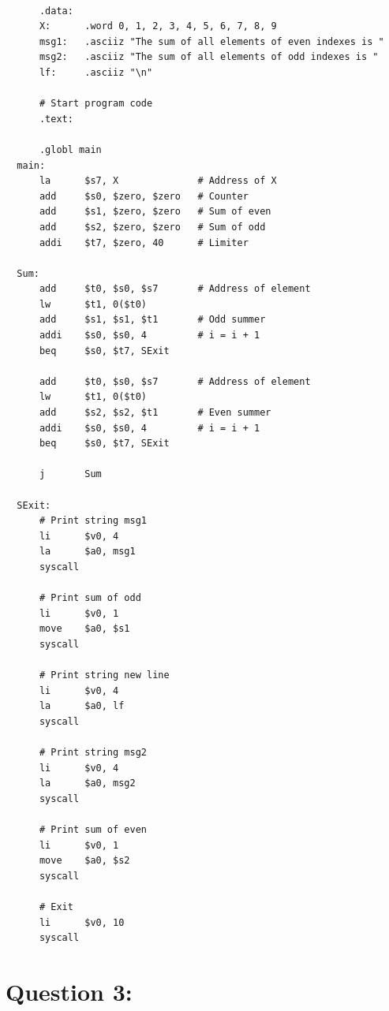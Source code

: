 \documentclass[12pt,a4paper]{article}
\begin{document}
\begin{mdframed}[hidealllines=true,backgroundcolor=magenta!10]
  \begin{lstlisting}

      .data:
      X:      .word 0, 1, 2, 3, 4, 5, 6, 7, 8, 9
      msg1:   .asciiz "The sum of all elements of even indexes is "
      msg2:   .asciiz "The sum of all elements of odd indexes is "
      lf:     .asciiz "\n"

      # Start program code
      .text:

      .globl main
  main:
      la      $s7, X              # Address of X
      add     $s0, $zero, $zero   # Counter
      add     $s1, $zero, $zero   # Sum of even
      add     $s2, $zero, $zero   # Sum of odd
      addi    $t7, $zero, 40      # Limiter

  Sum:
      add     $t0, $s0, $s7       # Address of element
      lw      $t1, 0($t0)
      add     $s1, $s1, $t1       # Odd summer
      addi    $s0, $s0, 4         # i = i + 1
      beq     $s0, $t7, SExit

      add     $t0, $s0, $s7       # Address of element
      lw      $t1, 0($t0)
      add     $s2, $s2, $t1       # Even summer
      addi    $s0, $s0, 4         # i = i + 1
      beq     $s0, $t7, SExit

      j       Sum

  SExit:
      # Print string msg1
      li      $v0, 4
      la      $a0, msg1
      syscall

      # Print sum of odd
      li      $v0, 1
      move    $a0, $s1
      syscall

      # Print string new line
      li      $v0, 4
      la      $a0, lf
      syscall

      # Print string msg2
      li      $v0, 4
      la      $a0, msg2
      syscall

      # Print sum of even
      li      $v0, 1
      move    $a0, $s2
      syscall

      # Exit
      li      $v0, 10
      syscall

    \end{lstlisting}
\end{mdframed}

\section*{Question 3:}
\end{document}
